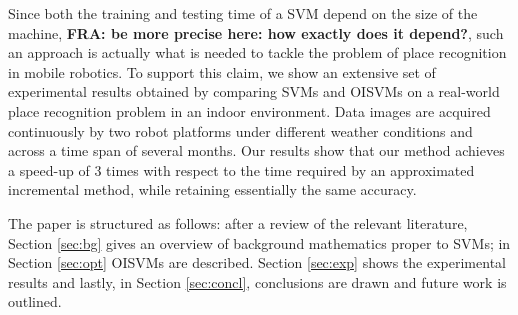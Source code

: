 Since both the training and testing time of a SVM depend on the size
of the machine, \textbf{FRA: be more precise here: how exactly does it
depend?}, such an approach is actually what is needed to tackle the
problem of place recognition in mobile robotics. To support this
claim, we show an extensive set of experimental results obtained by
comparing SVMs and OISVMs 
on a real-world place recognition problem in an indoor
environment. Data images are acquired continuously by two robot
platforms under different weather conditions and across a time span of
several months. Our results show that our method achieves a speed-up of
$3$ times with respect to the time required by an approximated
incremental method, while retaining essentially the same accuracy.

The paper is structured as follows: after a review of the relevant
literature, Section \ref{sec:bg} gives an overview of background
mathematics proper to SVMs; in Section \ref{sec:opt} OISVMs are
described. Section \ref{sec:exp} shows the experimental results and
lastly, in Section \ref{sec:concl}, conclusions are drawn and future
work is outlined.
